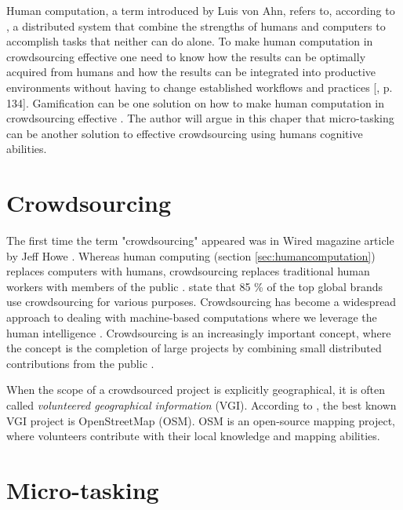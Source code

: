 Human computation, a term introduced by Luis von Ahn, refers to, according to \cite{Quinn2011}, a distributed system that combine the strengths of humans and computers to accomplish tasks that neither can do alone. To make human computation in crowdsourcing effective one need to know how the results can be optimally acquired from humans and how the results can be integrated into productive environments without having to change established workflows and practices [\citep{Meier2013}, p. 134]. Gamification can be one solution on how to make human computation in crowdsourcing effective \citep{Wang2017}. The author will argue in this chaper that micro-tasking can be another solution to effective crowdsourcing using humans cognitive abilities.

\section{Crowdsourcing}\label{sec:crowdsourcing}

The first time the term "crowdsourcing" appeared was in Wired magazine article by Jeff Howe \citep{Howe2006}. Whereas human computing (section \ref{sec:humancomputation}) replaces computers with humans, crowdsourcing replaces traditional human workers with members of the public \citep{Quinn2011}. \cite{EYeka2015} state that 85 \% of the top global brands use crowdsourcing for various purposes. Crowdsourcing has become a widespread approach to dealing with machine-based computations where we leverage the human intelligence \citep{Gadiraju2015}. Crowdsourcing is an increasingly important concept, where the concept is the completion of large projects by combining small distributed contributions from the public \citep{Salk2016}. 

When the scope of a crowdsourced project is explicitly geographical, it is often called \textit{volunteered geographical information} (VGI). According to \cite{Salk2016}, the best known VGI project is OpenStreetMap (OSM). OSM is an open-source mapping project, where volunteers contribute with their local knowledge and mapping abilities. 

\section{Micro-tasking}\label{sec:microtasking}

